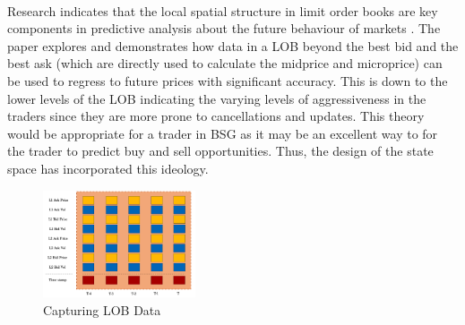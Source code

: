 \documentclass[ %
                    author={Ashwinder Khurana},
                supervisor={Prof Dave Cliff},
                    degree={MEng},
                     title={The Deeply Reinforced Trader},
                  subtitle={},
                      type={enterprise},
                      year={2020} ]{dissertation}
\begin{document}
{\\
Research indicates that the local spatial structure in limit order books are key components in predictive analysis about the future behaviour of markets \cite{Deep learning for limit order books paper in research folder}. The paper explores and demonstrates how data in a LOB beyond the best bid and the best ask (which are directly used to calculate the midprice and microprice) can be used to regress to future prices with significant accuracy. This is down to the lower levels of the LOB indicating the varying levels of aggressiveness in the traders since they are more prone to cancellations and updates. This  theory would be appropriate for a trader in BSG as it may be an excellent way to for the trader to predict buy and sell opportunities. Thus, the design of the state space has incorporated this ideology. 

\begin{figure}[H]
	\centering
  	\includegraphics[width=0.4\textwidth]{LOB-Snapshot.png}
 	\caption{Capturing LOB Data}
	\label{fig:LOB-Snapshot}  
\end{figure}

}
\end{document}
